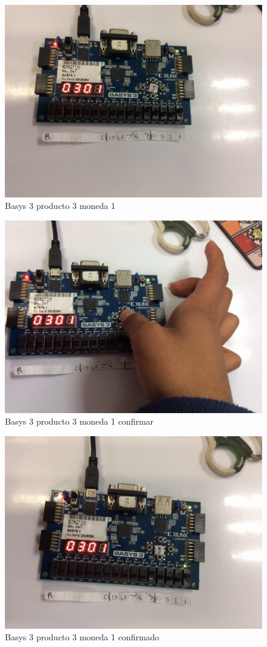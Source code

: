 \documentclass[12pt]{article}  %
\begin{document}
\begin{figure}[!ht]
  \centering
  \caption{Basys 3 producto 3 moneda 1}
  \includegraphics[width=0.75\linewidth]{Imagenes/Basys/product3-coin1.png}
\end{figure}

\begin{figure}[!ht]
  \centering
  \caption{Basys 3 producto 3 moneda 1 confirmar}
  \includegraphics[width=0.75\linewidth]{Imagenes/Basys/product3-coin1-confirm.png}
\end{figure}

\newpage

\begin{figure}[!ht]
  \centering
  \caption{Basys 3 producto 3 moneda 1 confirmado}
  \includegraphics[width=0.75\linewidth]{Imagenes/Basys/product3-coin1-confirmed.png}
\end{figure}
\end{document}
